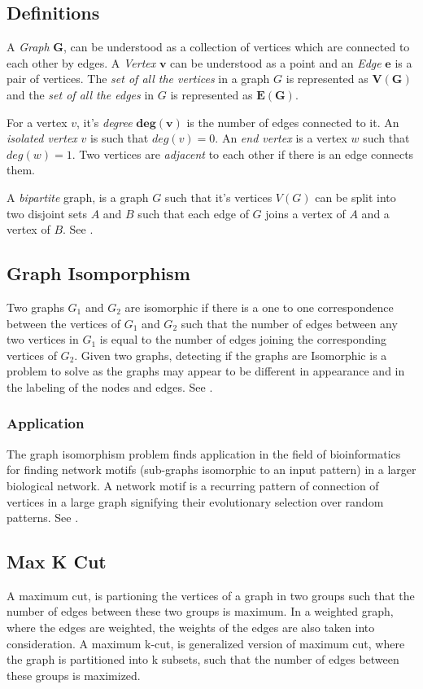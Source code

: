\subsection{Definitions}
\label{graphtheory: definitions}
A \emph{Graph} $\boldsymbol{G}$, can be understood as a collection of vertices which are
connected to each other by edges.  A \emph{Vertex} $\boldsymbol{v}$ can be understood as a
point and an \emph{Edge} $\boldsymbol{e}$ is a pair of vertices.  The \emph{set of all the vertices}
in a graph $G$ is represented as $\boldsymbol{V(G)}$ and the \emph{set of all the
edges} in $G$ is represented as $\boldsymbol{E(G)}$.

For a vertex $v$, it's \emph{degree} $\boldsymbol{deg(v)}$ is the number of edges
connected to it.  An \emph{isolated vertex} $v$ is such that $deg(v) = 0$. An
\emph{end vertex} is a vertex $w$ such that $deg(w) = 1$.  Two vertices are
\emph{adjacent} to each other if there is an edge connects them.

A \emph{bipartite} graph, is a graph $G$ such that it's vertices $V(G)$ can
be split into two disjoint sets $A$ and $B$ such that each edge of $G$ joins a
vertex of $A$ and a vertex of $B$. See \cite{Newman10}.


\subsection{Graph Isomporphism}
Two graphs $G_1$ and $G_2$ are isomorphic if there is a one to one correspondence
between the vertices of $G_1$ and $G_2$ such that the number of edges between any
two vertices in $G_1$ is equal to the number of edges joining the corresponding
vertices of $G_2$.  Given two graphs, detecting if the graphs are Isomorphic is
a problem to solve as the graphs may appear to be different in appearance and
in the labeling of the nodes and edges. See \cite{Newman10}.

\subsubsection{Application}
The graph isomorphism problem finds application in the field of bioinformatics
for finding network motifs (sub-graphs isomorphic to an input pattern) in a
larger biological network. A network motif is a recurring pattern of connection
of vertices in a large graph signifying their evolutionary selection over
random patterns. See \cite{Bonnici2013}.

\subsection{Max K Cut}
A maximum cut, is partioning the vertices of a graph in two groups such that
the number of edges between these two groups is maximum. In a weighted graph,
where the edges are weighted, the weights of the edges are also taken into
consideration.  A maximum k-cut, is generalized version of maximum cut, where
the graph is partitioned into k subsets, such that the number of edges between
these groups is maximized.

